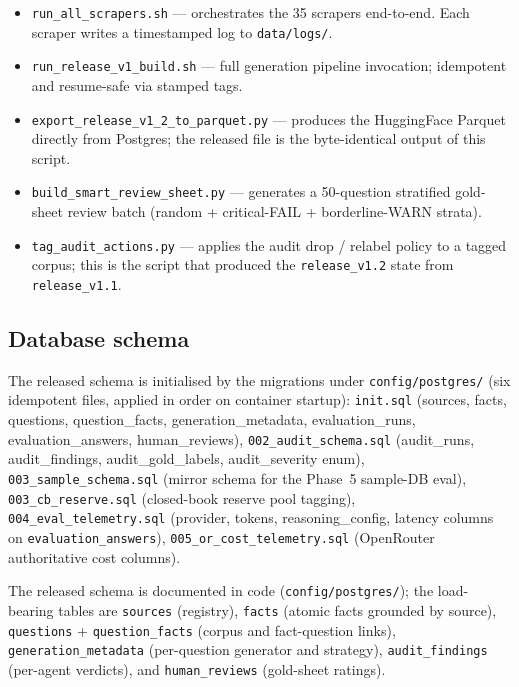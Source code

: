 \begin{itemize}\itemsep -1pt
  \item \texttt{run\_all\_scrapers.sh} — orchestrates the 35 scrapers
    end-to-end. Each scraper writes a timestamped log to
    \texttt{data/logs/}.
  \item \texttt{run\_release\_v1\_build.sh} — full generation pipeline
    invocation; idempotent and resume-safe via stamped tags.
  \item \texttt{export\_release\_v1\_2\_to\_parquet.py} — produces the
    HuggingFace Parquet directly from Postgres; the released file
    is the byte-identical output of this script.
  \item \texttt{build\_smart\_review\_sheet.py} — generates a 50-question
    stratified gold-sheet review batch (random + critical-FAIL +
    borderline-WARN strata).
  \item \texttt{tag\_audit\_actions.py} — applies the audit drop /
    relabel policy to a tagged corpus; this is the script that
    produced the \texttt{release\_v1.2} state from
    \texttt{release\_v1.1}.
\end{itemize}

\subsection{Database schema}

The released schema is initialised by the migrations under
\texttt{config/postgres/} (six idempotent files, applied in order on
container startup):
\texttt{init.sql} (sources, facts, questions, question\_facts,
generation\_metadata, evaluation\_runs, evaluation\_answers,
human\_reviews),
\texttt{002\_audit\_schema.sql} (audit\_runs, audit\_findings,
audit\_gold\_labels, audit\_severity enum),
\texttt{003\_sample\_schema.sql} (mirror schema for the Phase~5
sample-DB eval),
\texttt{003\_cb\_reserve.sql} (closed-book reserve pool tagging),
\texttt{004\_eval\_telemetry.sql} (provider, tokens, reasoning\_config,
latency columns on \texttt{evaluation\_answers}),
\texttt{005\_or\_cost\_telemetry.sql} (OpenRouter authoritative cost
columns).

The released schema is documented in code
(\texttt{config/postgres/}); the load-bearing tables are
\texttt{sources} (registry), \texttt{facts} (atomic facts grounded by
source), \texttt{questions} + \texttt{question\_facts} (corpus and
fact-question links), \texttt{generation\_metadata} (per-question
generator and strategy), \texttt{audit\_findings} (per-agent
verdicts), and \texttt{human\_reviews} (gold-sheet ratings).

